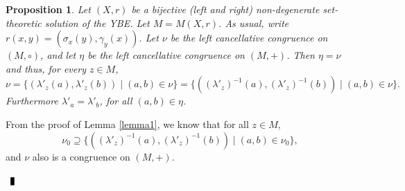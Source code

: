 \documentclass[10pt]{article}
\newtheorem{proposition}[theorem]{Proposition}
\newenvironment{proof}{\par\noindent{\bf Proof.}}{$\qed$\par\bigskip}
\newcommand{\qed}{\enspace\vrule  height6pt  width4pt  depth2pt}
\begin{document}
\begin{proposition}\label{q}
	Let $(X,r)$ be a bijective (left and right) non-degenerate set-theoretic solution of the YBE. Let $M=M(X,r)$. As usual, write  $r(x,y)=(\sigma_x(y),\gamma_y(x))$.  Let $\nu$ be the left cancellative congruence on $(M,\circ)$, and let $\eta$ be the left cancellative congruence on $(M,+)$. Then $\eta=\nu$ and thus, for every $z\in M$,
	$$\nu=\{ (\lambda'_z(a),\lambda'_z(b))\mid (a,b)\in \nu\}=\{((\lambda'_z)^{-1}(a),(\lambda'_z)^{-1}(b))\mid (a,b)\in \nu\}.$$
	Furthermore $\lambda'_a=\lambda'_b$, for all $(a,b)\in \eta$.
	\end{proposition}

\begin{proof}
	From the proof of Lemma \ref{lemma1}, we know that for
	all $z\in M$,
	$$\nu_0\supseteq \{ ( (\lambda'_z)^{-1}(a),(\lambda'_z)^{-1}(b))\mid (a,b)\in\nu_0\},$$
	and $\nu$ also is a congruence on $(M,+)$.
	

\end{proof}
\end{document}
